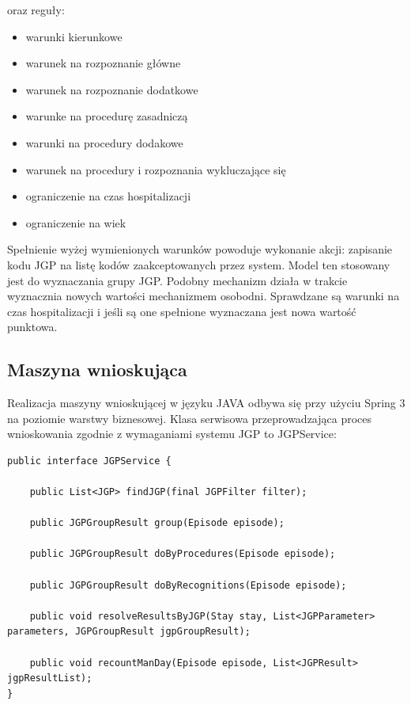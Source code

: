 oraz reguły:
\begin{itemize}
 \item warunki kierunkowe
 \item warunek na rozpoznanie główne
 \item warunek na rozpoznanie dodatkowe
 \item warunke na procedurę zasadniczą
 \item warunki na procedury dodakowe
 \item warunek na procedury i rozpoznania wykluczające się	
 \item ograniczenie na czas hospitalizacji
 \item ograniczenie na wiek
\end{itemize}
Spełnienie wyżej wymienionych warunków powoduje wykonanie akcji: zapisanie kodu JGP na listę kodów zaakceptowanych przez system. Model ten stosowany jest do wyznaczania grupy JGP.
Podobny mechanizm działa w trakcie wyznacznia nowych wartości mechanizmem osobodni.
Sprawdzane są warunki na czas hospitalizacji i jeśli są one spełnione wyznaczana jest nowa wartość punktowa.

\subsection{Maszyna wnioskująca}
\label{sec:maszynaWnioskujaca}
Realizacja maszyny wnioskującej w języku JAVA odbywa się przy użyciu Spring 3 na poziomie warstwy biznesowej. Klasa serwisowa przeprowadzająca proces wnioskowania zgodnie z wymaganiami systemu JGP to JGPService:
\begin{verbatim}
public interface JGPService {

    public List<JGP> findJGP(final JGPFilter filter);

    public JGPGroupResult group(Episode episode);

    public JGPGroupResult doByProcedures(Episode episode);

    public JGPGroupResult doByRecognitions(Episode episode);

    public void resolveResultsByJGP(Stay stay, List<JGPParameter> parameters, JGPGroupResult jgpGroupResult);

    public void recountManDay(Episode episode, List<JGPResult> jgpResultList);
}
\end{verbatim}

